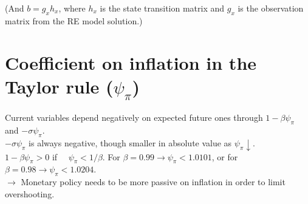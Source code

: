 \documentclass[11pt]{article}
\renewcommand{\[}{\begin{equation}}
\renewcommand{\]}{\end{equation}}
\begin{document}
(And $b = g_x h_x$, where $h_x$ is the state transition matrix and $g_x$ is the observation matrix from the RE model solution.)

\section{Coefficient on inflation in the Taylor rule ($\psi_{\pi}$)}
Current variables depend negatively on expected future ones through $1-\beta\psi_{\pi}$ and $-\sigma\psi_{\pi}$. \\

$-\sigma\psi_{\pi}$ is always negative, though smaller in absolute value as $\psi_{\pi} \downarrow$. \\

$1-\beta\psi_{\pi} > 0 $ if $\quad \psi_{\pi} < 1/\beta$. For $\beta=0.99 \rightarrow \psi_{\pi} < 1.0101$, or for $\beta=0.98 \rightarrow \psi_{\pi} < 1.0204$. \\ $\rightarrow$ Monetary policy needs to be more passive on inflation in order to limit overshooting.
\end{document}
